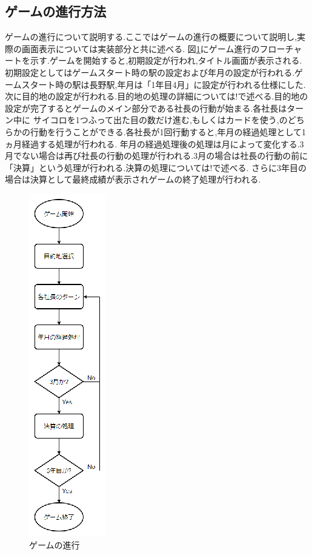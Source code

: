 \documentclass[a4j]{jarticle}
\begin{document}
    \subsection{ゲームの進行方法}
    ゲームの進行について説明する.ここではゲームの進行の概要について説明し,実際の画面表示については実装部分と共に述べる.
    図\ref{processgame}にゲーム進行のフローチャートを示す.ゲームを開始すると,初期設定が行われ,タイトル画面が表示される.
    初期設定としてはゲームスタート時の駅の設定および年月の設定が行われる.ゲームスタート時の駅は長野駅,年月は「1年目4月」に設定が行われる仕様にした.
    次に目的地の設定が行われる.目的地の処理の詳細については!で述べる.目的地の設定が完了するとゲームのメイン部分である社長の行動が始まる.各社長はターン中に
    サイコロを1つふって出た目の数だけ進む,もしくはカードを使う,のどちらかの行動を行うことができる.各社長が1回行動すると,年月の経過処理として1ヵ月経過する処理が行われる.
    年月の経過処理後の処理は月によって変化する.3月でない場合は再び社長の行動の処理が行われる.3月の場合は社長の行動の前に「決算」という処理が行われる.決算の処理については!で述べる.
    さらに3年目の場合は決算として最終成績が表示されゲームの終了処理が行われる.
    \begin{figure}[H]
        \centering
        \includegraphics[scale=2.3]{processgame.eps}
        \caption{ゲームの進行}
         \label{processgame}
        \end{figure}
\end{document}
